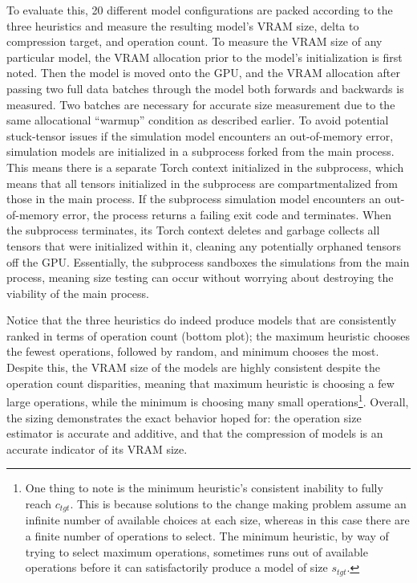 To evaluate this, 20 different model configurations are packed according to the three heuristics and measure the resulting model's
VRAM size, delta to compression target, and operation count. To measure the VRAM size of any particular model, the
 VRAM allocation prior to the model's initialization is first noted. Then the model is moved onto the GPU, and the
VRAM allocation after passing two full data batches through the model both forwards and backwards is measured.
Two batches are necessary for accurate size measurement due to the same allocational ``warmup'' condition as described earlier.
To avoid potential stuck-tensor issues if the simulation model encounters an out-of-memory error, simulation models
 are initialized in a subprocess forked from the main process. This means there is a separate Torch context initialized in
the subprocess, which means that all tensors initialized in the subprocess are compartmentalized from those in the
main process. If the subprocess simulation model encounters an out-of-memory error, the process returns a failing exit
code and terminates. When the subprocess terminates, its Torch context deletes and garbage collects all tensors
that were initialized within it, cleaning any potentially orphaned tensors off the GPU.
Essentially, the subprocess sandboxes the simulations from the main process, meaning size testing can occur without
worrying about destroying the viability of the main process.

Notice that the three heuristics do indeed
produce models that are consistently ranked in terms of operation count (bottom plot); the maximum heuristic chooses the fewest operations,
followed by random, and minimum chooses the most. Despite this, the VRAM size of the models are highly consistent despite
the operation count disparities, meaning that maximum heuristic is choosing a few large operations, while the minimum is
choosing many small operations\footnote{One thing to note is the minimum heuristic's consistent inability to fully reach $c_{tgt}$.
This is because solutions to the change making problem assume an infinite number of available choices at each size, whereas in this case
there are a finite number of operations to select. The minimum heuristic, by way of trying to select maximum operations,
sometimes runs out of available operations before it can satisfactorily produce a model of size $s_{tgt}$.}.
Overall, the sizing demonstrates the exact behavior hoped for: the operation size estimator is accurate and additive,
and that the compression of models is an accurate indicator of its VRAM size.

